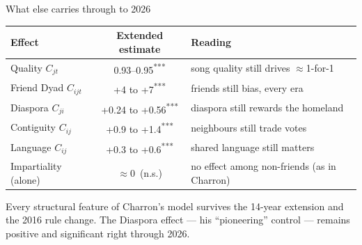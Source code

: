 \documentclass[aspectratio=169,10pt]{beamer}
\newcommand{\sg}[1]{\textsuperscript{#1}}
\begin{document}
\begin{frame}{What else carries through to 2026}
  \centering\small
  \renewcommand{\arraystretch}{1.25}
  \begin{tabular}{@{}l c l@{}}
    \toprule
    Effect & Extended estimate & Reading\\
    \midrule
    Quality $C_{jt}$        & 0.93--0.95\sg{***} & song quality still drives $\approx$1-for-1\\
    Friend Dyad $C_{ijt}$   & +4 to +7\sg{***}   & friends still bias, every era\\
    \rowcolor{yellow!25}
    Diaspora $C_{ji}$       & +0.24 to +0.56\sg{***} & diaspora still rewards the homeland\\
    Contiguity $C_{ij}$     & +0.9 to +1.4\sg{***} & neighbours still trade votes\\
    Language $C_{ij}$       & +0.3 to +0.6\sg{***} & shared language still matters\\
    Impartiality (alone)    & $\approx$0\ (n.s.)   & no effect among non-friends (as in Charron)\\
    \bottomrule
  \end{tabular}

  \vspace{6pt}
  \footnotesize
  Every structural feature of Charron's model survives the 14-year extension and the
  2016 rule change. The \colorbox{yellow!25}{Diaspora} effect --- his ``pioneering''
  control --- remains positive and significant right through 2026.
\end{frame}
\end{document}
